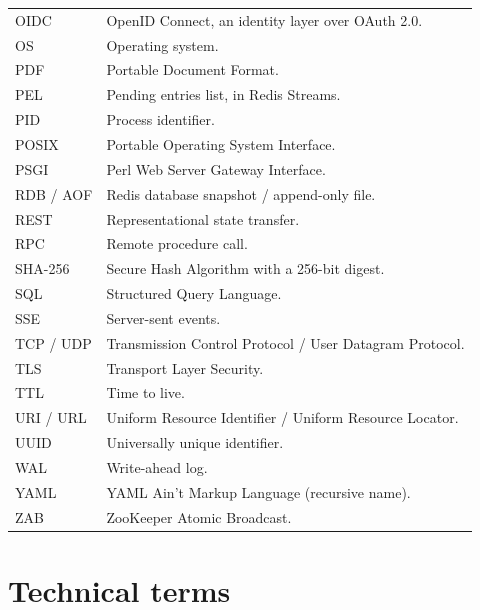 \documentclass[11pt,openany]{book}
\begin{document}
\begin{longtable}{L{.20\linewidth}L{.72\linewidth}}
OIDC & OpenID Connect, an identity layer over OAuth 2.0.\\
OS & Operating system.\\
PDF & Portable Document Format.\\
PEL & Pending entries list, in Redis Streams.\\
PID & Process identifier.\\
POSIX & Portable Operating System Interface.\\
PSGI & Perl Web Server Gateway Interface.\\
RDB / AOF & Redis database snapshot / append-only file.\\
REST & Representational state transfer.\\
RPC & Remote procedure call.\\
SHA-256 & Secure Hash Algorithm with a 256-bit digest.\\
SQL & Structured Query Language.\\
SSE & Server-sent events.\\
TCP / UDP & Transmission Control Protocol / User Datagram Protocol.\\
TLS & Transport Layer Security.\\
TTL & Time to live.\\
URI / URL & Uniform Resource Identifier / Uniform Resource Locator.\\
UUID & Universally unique identifier.\\
WAL & Write-ahead log.\\
YAML & YAML Ain't Markup Language (recursive name).\\
ZAB & ZooKeeper Atomic Broadcast.\\
\bottomrule
\end{longtable}
\section*{Technical terms}
\end{document}
